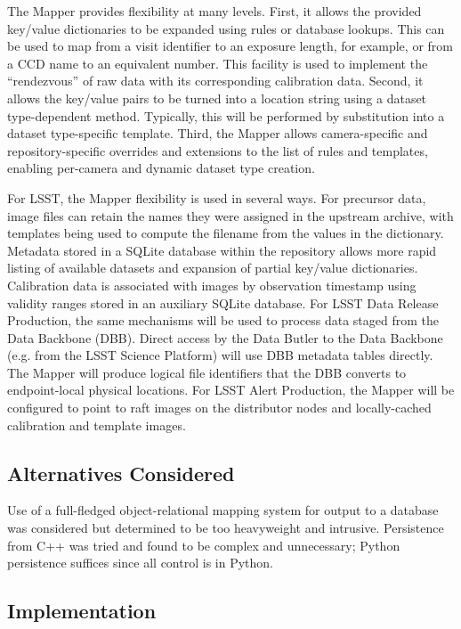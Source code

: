 \documentclass[DM,toc]{lsstdoc}
\begin{document}
The Mapper provides flexibility at many levels. First, it allows the
provided key/value dictionaries to be expanded using rules or database
lookups. This can be used to map from a visit identifier to an exposure
length, for example, or from a CCD name to an equivalent number. This
facility is used to implement the ``rendezvous'' of raw data with its
corresponding calibration data. Second, it allows the key/value pairs to
be turned into a location string using a dataset type-dependent method.
Typically, this will be performed by substitution into a dataset
type-specific template. Third, the Mapper allows camera-specific and
repository-specific overrides and extensions to the list of rules and
templates, enabling per-camera and dynamic dataset type creation.

For LSST, the Mapper flexibility is used in several ways.  For precursor data,
image files can retain the names they were assigned in the upstream archive,
with templates being used to compute the filename from the values in the
dictionary.  Metadata stored in a SQLite database within the repository allows
more rapid listing of available datasets and expansion of partial key/value
dictionaries.  Calibration data is associated with images by observation
timestamp using validity ranges stored in an auxiliary SQLite database.  For
LSST Data Release Production, the same mechanisms will be used to process data
staged from the Data Backbone (DBB).  Direct access by the Data Butler to the
Data Backbone (e.g. from the LSST Science Platform) will use DBB metadata
tables directly.  The Mapper will produce logical file identifiers that the DBB
converts to endpoint-local physical locations.  For LSST Alert Production, the
Mapper will be configured to point to raft images on the distributor nodes and
locally-cached calibration and template images.

\subsection{Alternatives Considered}\label{alternatives-considered}

Use of a full-fledged object-relational mapping system for output to a
database was considered but determined to be too heavyweight and
intrusive. Persistence from C++ was tried and found to be complex and
unnecessary; Python persistence suffices since all control is in Python.

\subsection{Implementation}\label{butler-implementation}
\end{document}
